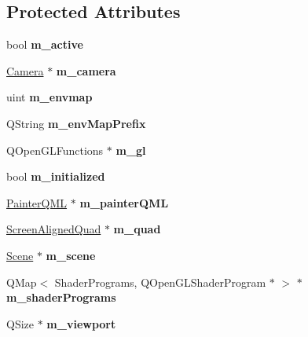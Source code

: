 \subsection*{Protected Attributes}
\begin{DoxyCompactItemize}
\item 
\hypertarget{class_painter_a9b476c949ca4b2af7b1653c7106b659b}{}bool {\bfseries m\+\_\+active}\label{class_painter_a9b476c949ca4b2af7b1653c7106b659b}

\item 
\hypertarget{class_painter_a05558ea7a2f818641e0506d01d518010}{}\hyperlink{class_camera}{Camera} $\ast$ {\bfseries m\+\_\+camera}\label{class_painter_a05558ea7a2f818641e0506d01d518010}

\item 
\hypertarget{class_painter_a141349e5459cd3ce52bb12b85579f752}{}uint {\bfseries m\+\_\+envmap}\label{class_painter_a141349e5459cd3ce52bb12b85579f752}

\item 
\hypertarget{class_painter_a983045c9611224d2576cf1d20fb87770}{}Q\+String {\bfseries m\+\_\+env\+Map\+Prefix}\label{class_painter_a983045c9611224d2576cf1d20fb87770}

\item 
\hypertarget{class_painter_a8aa44a5f1477d570ee10d3dacae09f08}{}Q\+Open\+G\+L\+Functions $\ast$ {\bfseries m\+\_\+gl}\label{class_painter_a8aa44a5f1477d570ee10d3dacae09f08}

\item 
\hypertarget{class_painter_a0adcfafb8172b4f76561e2c951b1090b}{}bool {\bfseries m\+\_\+initialized}\label{class_painter_a0adcfafb8172b4f76561e2c951b1090b}

\item 
\hypertarget{class_painter_af2774293bfaf6f654cb01e504937abb8}{}\hyperlink{class_painter_q_m_l}{Painter\+Q\+M\+L} $\ast$ {\bfseries m\+\_\+painter\+Q\+M\+L}\label{class_painter_af2774293bfaf6f654cb01e504937abb8}

\item 
\hypertarget{class_painter_a50f7fad2d44554f0be878a96afacfa44}{}\hyperlink{class_screen_aligned_quad}{Screen\+Aligned\+Quad} $\ast$ {\bfseries m\+\_\+quad}\label{class_painter_a50f7fad2d44554f0be878a96afacfa44}

\item 
\hypertarget{class_painter_a9aa927a8a72482a508d5abd8e4f7d590}{}\hyperlink{class_scene}{Scene} $\ast$ {\bfseries m\+\_\+scene}\label{class_painter_a9aa927a8a72482a508d5abd8e4f7d590}

\item 
\hypertarget{class_painter_ac1208fd08f67613750efb7adbb718cea}{}Q\+Map$<$ Shader\+Programs, Q\+Open\+G\+L\+Shader\+Program $\ast$ $>$ $\ast$ {\bfseries m\+\_\+shader\+Programs}\label{class_painter_ac1208fd08f67613750efb7adbb718cea}

\item 
\hypertarget{class_painter_a9369e3a89f7074d7fae461acb18adf45}{}Q\+Size $\ast$ {\bfseries m\+\_\+viewport}\label{class_painter_a9369e3a89f7074d7fae461acb18adf45}

\end{DoxyCompactItemize}


